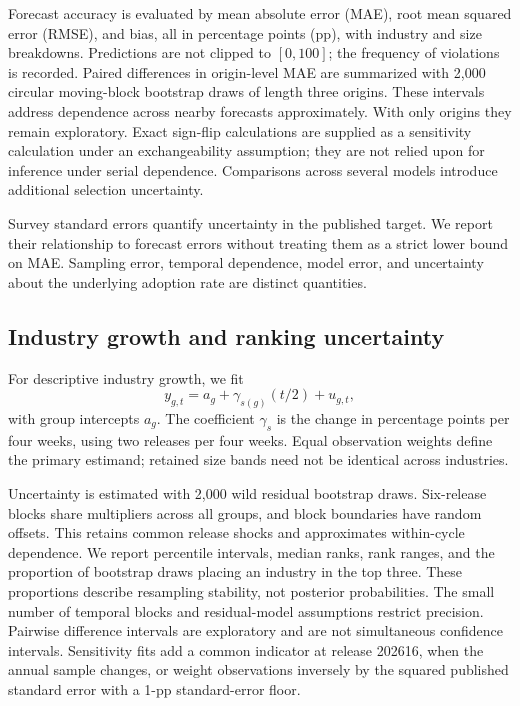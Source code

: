 \documentclass[11pt]{article}
\begin{document}
Forecast accuracy is evaluated by mean absolute error (MAE), root mean squared error (RMSE), and bias, all in percentage points (pp), with industry and size breakdowns. Predictions are not clipped to $[0,100]$; the frequency of violations is recorded. Paired differences in origin-level MAE are summarized with 2,000 circular moving-block bootstrap draws of length three origins. These intervals address dependence across nearby forecasts approximately. With only \OriginN{} origins they remain exploratory. Exact sign-flip calculations are supplied as a sensitivity calculation under an exchangeability assumption; they are not relied upon for inference under serial dependence. Comparisons across several models introduce additional selection uncertainty.

Survey standard errors quantify uncertainty in the published target. We report their relationship to forecast errors without treating them as a strict lower bound on MAE. Sampling error, temporal dependence, model error, and uncertainty about the underlying adoption rate are distinct quantities.

\subsection{Industry growth and ranking uncertainty}
For descriptive industry growth, we fit
\begin{equation}
 y_{g,t}=a_g+\gamma_{s(g)}(t/2)+u_{g,t},
\end{equation}
with group intercepts $a_g$. The coefficient $\gamma_s$ is the change in percentage points per four weeks, using two releases per four weeks. Equal observation weights define the primary estimand; retained size bands need not be identical across industries.

Uncertainty is estimated with 2,000 wild residual bootstrap draws. Six-release blocks share multipliers across all groups, and block boundaries have random offsets. This retains common release shocks and approximates within-cycle dependence. We report percentile intervals, median ranks, rank ranges, and the proportion of bootstrap draws placing an industry in the top three. These proportions describe resampling stability, not posterior probabilities. The small number of temporal blocks and residual-model assumptions restrict precision. Pairwise difference intervals are exploratory and are not simultaneous confidence intervals. Sensitivity fits add a common indicator at release 202616, when the annual sample changes, or weight observations inversely by the squared published standard error with a 1-pp standard-error floor.
\end{document}
